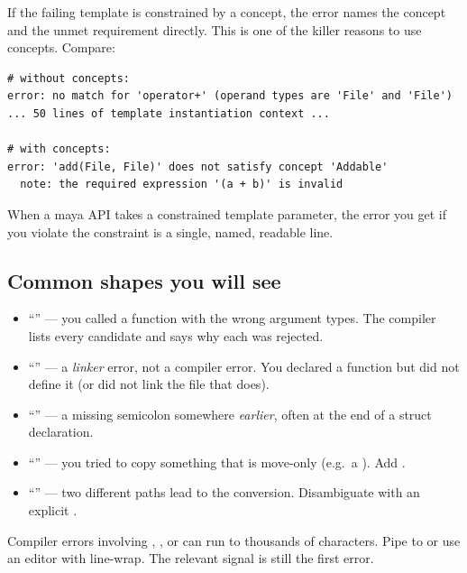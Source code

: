 If the failing template is constrained by a concept, the error names
the concept and the unmet requirement directly. This is one of the
killer reasons to use concepts. Compare:

\begin{lstlisting}[style=shell]
# without concepts:
error: no match for 'operator+' (operand types are 'File' and 'File')
... 50 lines of template instantiation context ...

# with concepts:
error: 'add(File, File)' does not satisfy concept 'Addable'
  note: the required expression '(a + b)' is invalid
\end{lstlisting}

When a maya API takes a constrained template parameter, the error
you get if you violate the constraint is a single, named, readable
line.

\subsection{Common shapes you will see}

\begin{itemize}[leftmargin=*]
  \item ``'' --- you
    called a function with the wrong argument types. The compiler
    lists every candidate and says why each was rejected.
  \item ``'' --- a \emph{linker}
    error, not a compiler error. You declared a function but did
    not define it (or did not link the file that does).
  \item ``'' --- a missing semicolon
    somewhere \emph{earlier}, often at the end of a struct
    declaration.
  \item ``'' --- you tried to
    copy something that is move-only (e.g.\ a ).
    Add .
  \item ``'' --- two
    different paths lead to the conversion. Disambiguate with an
    explicit .
\end{itemize}

\begin{warning}
Compiler errors involving , , or
 can run to thousands of characters. Pipe to
 or use an editor with line-wrap. The relevant signal is
still the first error.
\end{warning}

